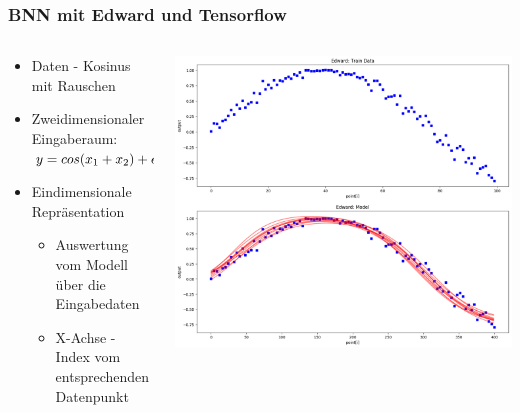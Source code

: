 \documentclass[18pt]{beamer}
\begin{document}
\begin{frame}
  \frametitle{BNN mit Edward und Tensorflow}
  \begin{columns}
    \begin{column}{0.4\textwidth}
      \begin{itemize}
      \item Daten - Kosinus mit Rauschen
      \item Zweidimensionaler Eingaberaum: $y = cos(x_1 + x_2) + \epsilon, \newline \epsilon\sim N(0, 0.2)$
        \item Eindimensionale Repräsentation
        \begin{itemize}
        \item Auswertung vom Modell über die Eingabedaten
        \item X-Achse - Index vom entsprechenden Datenpunkt
        \end{itemize} 
      \end{itemize}
    \end{column}
    \begin{column}{0.6\textwidth}
      \includegraphics[scale=0.225]{images/edward_example_bnn}
    \end{column}
  \end{columns}
\end{frame}
\end{document}
